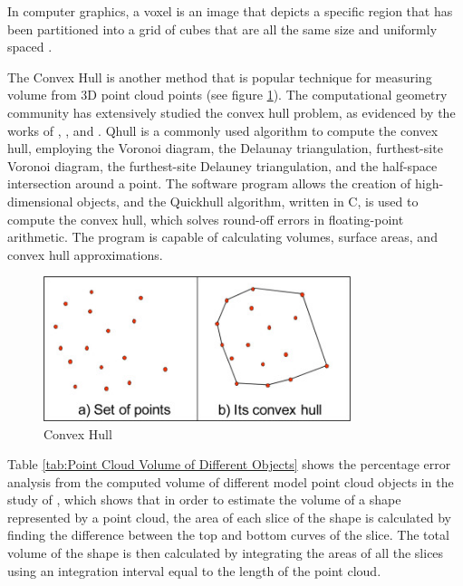 In computer graphics, a voxel is an image that depicts a specific region that has been partitioned into a grid of cubes that are all the same size and uniformly spaced \citep{putman2018}.

The Convex Hull is another method that is popular technique for measuring volume from 3D point cloud points (see figure \ref{fig:convex hull}). The computational geometry community has extensively studied the convex hull problem, as evidenced by the works of \citet{kim2002}, \citet{graham1983}, and \citet{maus1984}. Qhull is a commonly used algorithm to compute the convex hull, employing the Voronoi diagram, the Delaunay triangulation, furthest-site Voronoi diagram, the furthest-site Delauney triangulation, and the half-space intersection around a point. The software program allows the creation of high-dimensional objects, and the Quickhull algorithm, written in C, is used to compute the convex hull, which solves round-off errors in floating-point arithmetic. The program is capable of calculating volumes, surface areas, and convex hull approximations.

\begin{figure}[H]
	\centering
	\includegraphics[width=0.8\textwidth]{Figures/convex hull.jpg}
	\caption{Convex Hull}
	\label{fig:convex hull}
\end{figure}

Table \ref{tab:Point Cloud Volume of Different Objects} shows the percentage error analysis from the computed volume of different model point cloud objects in the study of \citet{chang2017}, which shows that in order to estimate the volume of a shape represented by a point cloud, the area of each slice of the shape is calculated by finding the difference between the top and bottom curves of the slice. The total volume of the shape is then calculated by integrating the areas of all the slices using an integration interval equal to the length of the point cloud.

